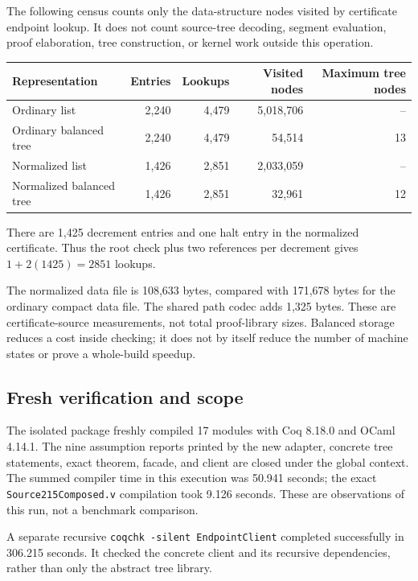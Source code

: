 \documentclass[11pt]{article}
\newcommand{\code}[1]{\texttt{#1}}
\theoremstyle{remark}
\begin{document}
The following census counts only the data-structure nodes visited by
certificate endpoint lookup. It does not count source-tree decoding,
segment evaluation, proof elaboration, tree construction, or kernel work
outside this operation.

\begin{center}
\small
\begin{tabular}{lrrrr}
\toprule
Representation & Entries & Lookups & Visited nodes & Maximum tree nodes\\
\midrule
Ordinary list & 2,240 & 4,479 & 5,018,706 & --\\
Ordinary balanced tree & 2,240 & 4,479 & 54,514 & 13\\
Normalized list & 1,426 & 2,851 & 2,033,059 & --\\
Normalized balanced tree & 1,426 & 2,851 & 32,961 & 12\\
\bottomrule
\end{tabular}
\end{center}

There are 1,425 decrement entries and one halt entry in the normalized
certificate. Thus the root check plus two references per decrement gives
\(1+2(1425)=2851\) lookups.

The normalized data file is 108,633 bytes, compared with 171,678 bytes for
the ordinary compact data file. The shared path codec adds 1,325 bytes.
These are certificate-source measurements, not total proof-library sizes.
Balanced storage reduces a cost inside checking; it does not by itself
reduce the number of machine states or prove a whole-build speedup.

\subsection{Fresh verification and scope}

The isolated package freshly compiled 17 modules with Coq 8.18.0 and OCaml
4.14.1. The nine assumption reports printed by the new adapter, concrete
tree statements, exact theorem, facade, and client are closed under the
global context. The summed compiler time in this execution was 50.941
seconds; the exact \code{Source215Composed.v} compilation took 9.126 seconds.
These are observations of this run, not a benchmark comparison.

A separate recursive
\code{coqchk -silent EndpointClient} completed successfully in 306.215
seconds. It checked the concrete client and its recursive dependencies,
rather than only the abstract tree library.
\end{document}
